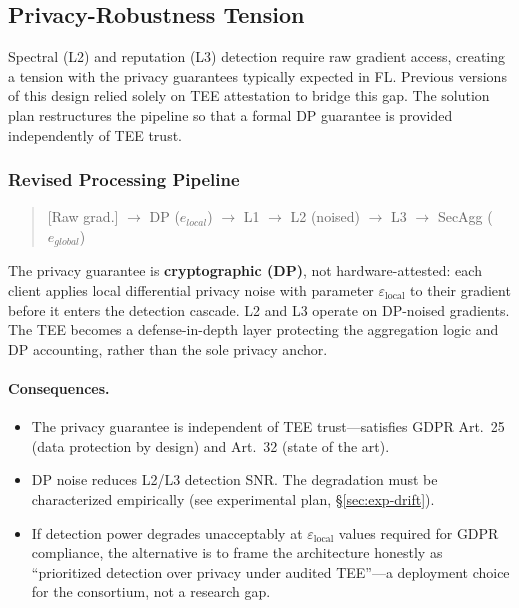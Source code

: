 \documentclass[10pt,journal]{IEEEtran}
\begin{document}
\subsection{Privacy-Robustness Tension}\label{sec:privacy-robustness}

Spectral (L2) and reputation (L3) detection require raw gradient access, creating a tension with the privacy guarantees typically expected in FL. Previous versions of this design relied solely on TEE attestation to bridge this gap. The solution plan restructures the pipeline so that a formal DP guarantee is provided independently of TEE trust.

\subsubsection{Revised Processing Pipeline}

\begin{quote}
\ttfamily\footnotesize{[Raw grad.] $\to$ DP ($e_{local}$) $\to$ L1 $\to$ L2 (noised) $\to$ L3 $\to$ SecAgg ($e_{global}$)}
\end{quote}

The privacy guarantee is \textbf{cryptographic (DP)}, not hardware-attested: each client applies local differential privacy noise with parameter $\varepsilon_{\text{local}}$ to their gradient before it enters the detection cascade. L2 and L3 operate on DP-noised gradients. The TEE becomes a defense-in-depth layer protecting the aggregation logic and DP accounting, rather than the sole privacy anchor.

\paragraph{Consequences.}
\begin{itemize}
  \item The privacy guarantee is independent of TEE trust---satisfies GDPR Art.~25 (data protection by design) and Art.~32 (state of the art).
  \item DP noise reduces L2/L3 detection SNR. The degradation must be characterized empirically (see experimental plan, \S\ref{sec:exp-drift}).
  \item If detection power degrades unacceptably at $\varepsilon_{\text{local}}$ values required for GDPR compliance, the alternative is to frame the architecture honestly as ``prioritized detection over privacy under audited TEE''---a deployment choice for the consortium, not a research gap.
\end{itemize}
\end{document}
